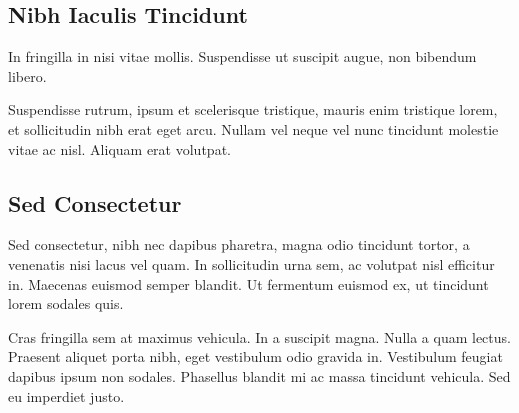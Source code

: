 \documentclass{beamer}
\begin{document}
\subsection{Nibh Iaculis Tincidunt}
\begin{frame}
    In fringilla in nisi vitae mollis. 
    Suspendisse ut suscipit augue, non bibendum libero. 


    Suspendisse rutrum, ipsum et scelerisque tristique, mauris enim tristique lorem, et sollicitudin nibh erat eget arcu. 
    Nullam vel neque vel nunc tincidunt molestie vitae ac nisl. 
    Aliquam erat volutpat.
\end{frame}

\subsection{Sed Consectetur}
\begin{frame}
    Sed consectetur, nibh nec dapibus pharetra, magna odio tincidunt tortor, a venenatis nisi lacus vel quam. 
    In sollicitudin urna sem, ac volutpat nisl efficitur in. 
    Maecenas euismod semper blandit. 
    Ut fermentum euismod ex, ut tincidunt lorem sodales quis. 


    Cras fringilla sem at maximus vehicula. 
    In a suscipit magna. 
    Nulla a quam lectus. 
    Praesent aliquet porta nibh, eget vestibulum odio gravida in. 
    Vestibulum feugiat dapibus ipsum non sodales. 
    Phasellus blandit mi ac massa tincidunt vehicula. 
    Sed eu imperdiet justo.
\end{frame}
\end{document}

